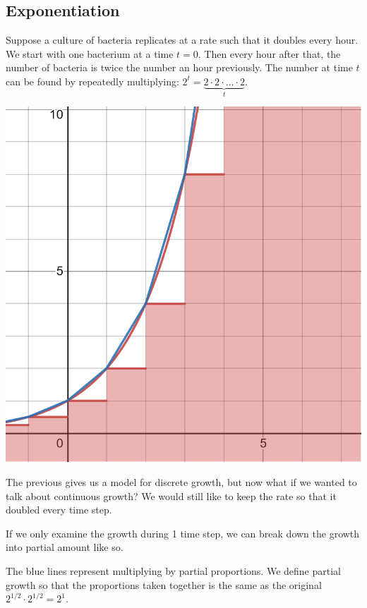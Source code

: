 \documentclass[../main.tex]{subfiles}
\begin{document}
\subsection{Exponentiation}

Suppose a culture of bacteria replicates at a rate such that it doubles every hour.
We start with one bacterium at a time \( t = 0 \).
Then every hour after that, the number of bacteria is twice the number an hour previously.
The number at time \( t \) can be found by repeatedly multiplying:
\( 2^t = \underbrace{2 \cdot 2 \cdot \ldots \cdot 2}_t \).

\noindent
\includegraphics[width=\textwidth]{fig/discrete.png}

The previous gives us a model for discrete growth,
but now what if we wanted to talk about continuous growth?
We would still like to keep the rate so that it doubled every time step.

If we only examine the growth during 1 time step,
we can break down the growth into partial amount like so.



The blue lines represent multiplying by partial proportions.
We define partial growth so that the proportions taken together is the same as the original
\( 2^{1/2} \cdot 2^{1/2} = 2^1 \).
\end{document}
